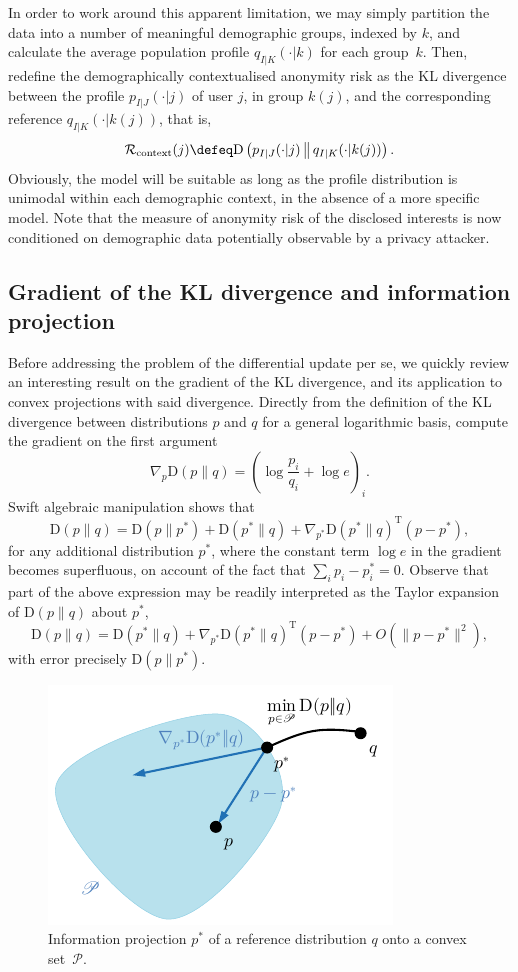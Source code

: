In order to work around this apparent limitation, we may simply partition the data into a number of meaningful demographic groups, indexed by $k$, and calculate the average population profile $q_{I|K}(\cdot|k)$ for each group~$k$. Then, redefine the demographically contextualised anonymity risk as the KL divergence between the profile $p_{I|J}(\cdot|j)$ of user $j$, in group $k(j)$, and the corresponding reference $q_{I|K}(\cdot|k(j))$, that is,
$$\mathcal{R}_\text{context}(j)\defeq\text{D}\left(p_{I|J}(\cdot|j)\,\middle\|\,q_{I|K}(\cdot|k(j))\right).$$
Obviously, the model will be suitable as long as the profile distribution is unimodal within each demographic context, in the absence of a more specific model. Note that the measure of anonymity risk of the disclosed interests is now conditioned on demographic data potentially observable by a privacy attacker.

\subsection{Gradient of the KL divergence and information projection}
\label{sec:1.3}

\noindent
Before addressing the problem of the differential update per se, we quickly review an interesting result on the gradient of the KL divergence, and its application to convex projections with said divergence. Directly from the definition of the KL divergence between distributions $p$ and $q$ for a general logarithmic basis, compute the gradient on the first argument
$$\nabla_p\text{D}(p\|q)={\left(\log \frac{p_i}{q_i}+\log e\right)}_i.$$
Swift algebraic manipulation shows that
$$\text{D}(p\|q)=\text{D}(p\|p^*)+\text{D}(p^*\|q)+\nabla_{p^*}\text{D}(p^*\|q)^\text{T}(p-p^*),$$
for any additional distribution $p^*$, where the constant term $\log e$ in the gradient becomes superfluous, on account of the fact that $\sum_i p_i-p_i^*=0$. Observe that part of the above expression may be readily interpreted as the Taylor expansion of $\text{D}(p\|q)$ about $p^*$,
$$\text{D}(p\|q)=\text{D}(p^*\|q)+\nabla_{p^*}\text{D}(p^*\|q)^\text{T}(p-p^*)+O(\|p-p^*\|^2),$$
with error precisely $\text{D}(p\|p^*)$.

\begin{figure}[htb]
\includegraphics[scale=\textwidth]{figures/ConvProj.pdf}
\caption[Information projection of a reference distribution onto a convex set]{Information projection $p^*$ of a reference distribution $q$ onto a convex set~$\mathscr{P}$.}
\label{fig:1}
\end{figure}

